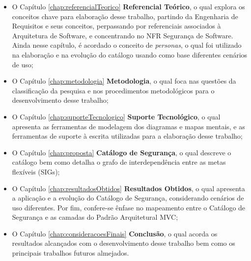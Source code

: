 \begin{itemize}
	\item O Capítulo \ref{chap:referencialTeorico} \textbf{Referencial Teórico}, o qual explora os conceitos chave para elaboração desse trabalho, partindo da Engenharia de Requisitos e seus conceitos, perpassando por referenciais associados à Arquitetura de Software, e concentrando no NFR Segurança de Software. Ainda nesse capítulo, é acordado o conceito de \textit{personas}, o qual foi utilizado na elaboração e na evolução do catálogo usando como base diferentes cenários de uso;
	
	\item O Capítulo \ref{chap:metodologia} \textbf{Metodologia}, o qual foca nas questões da classificação da pesquisa e nos procedimentos metodológicos para o desenvolvimento desse trabalho;
	
	\item  O Capítulo \ref{chap:suporteTecnologico} \textbf{Suporte Tecnológico}, o qual apresenta as ferramentas de modelagem dos diagramas e mapas mentais, e as ferramentas de suporte à escrita utilizadas para a elaboração desse trabalho;
	
	
	\item O Capítulo \ref{chap:proposta} \textbf{Catálogo de Segurança}, o qual descreve o catálogo bem como detalha o grafo de interdependência entre as metas flexíveis (SIGs);
	
	\item  O Capítulo  \ref{chap:resultadosObtidos} \textbf{Resultados Obtidos}, o qual apresenta a aplicação e a evolução do Catálogo de Segurança, considerando cenários de uso diferentes. Por fim, confere-se ênfase no mapeamento entre o Catálogo de Segurança e as camadas do Padrão Arquitetural MVC;
	
	\item  O Capítulo \ref{chap:consideracoesFinais} \textbf{Conclusão}, o qual acorda os resultados alcançados com o desenvolvimento desse trabalho bem como os principais trabalhos futuros almejados. 
\end{itemize}

